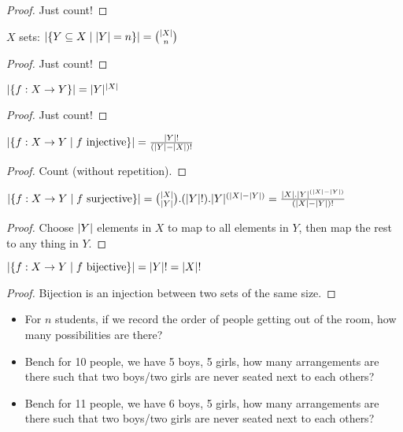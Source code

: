 \begin{proof}
Just count!
\end{proof}
\begin{property}
	$X$ sets: $|  \{ Y \subseteq X \mid | Y |=n \}  | = \binom{| X |}{n}$
\end{property}
\begin{proof}
	Just count!
\end{proof}
\begin{property}
	$|  \{f: X \to Y\}  | = | Y |^{| X |}$
\end{property}
\begin{proof}
	Just count!
\end{proof}
\begin{property}
	$|  \{f: X \to Y \mid f \text{ injective} \}  | = \frac{| Y |!}{(| Y |-| X |)!}$
\end{property}
\begin{proof}
	Count (without repetition).
\end{proof}
\begin{property}
	$|  \{f: X \to Y \mid f \text{ surjective} \}  | = \binom{| X |}{| Y |} . (| Y |!) . | Y |^{(| X |-| Y |)} = \frac{| X | . | Y |^{(| X |-| Y |)}}{(| X |-| Y |)!}$
\end{property}
\begin{proof}
	Choose $| Y |$ elements in $X$ to map to all elements in $Y$, then map the rest to any thing in $Y$.
\end{proof}
\begin{property}
	$|  \{f: X \to Y \mid f \text{ bijective} \}  | = | Y |! = | X |!$
\end{property}
\begin{proof}
	Bijection is an injection between two sets of the same size.
\end{proof}

\begin{question}
	\begin{itemize}
		\item For $n$ students, if we record the order of people getting out of the room, how many possibilities are there?
		\item Bench for 10 people, we have 5 boys, 5 girls, how many arrangements are there such that two boys/two girls are never seated next to each others?
		\item Bench for 11 people, we have 6 boys, 5 girls, how many arrangements are there such that two boys/two girls are never seated next to each others?
	\end{itemize}
\end{question}


